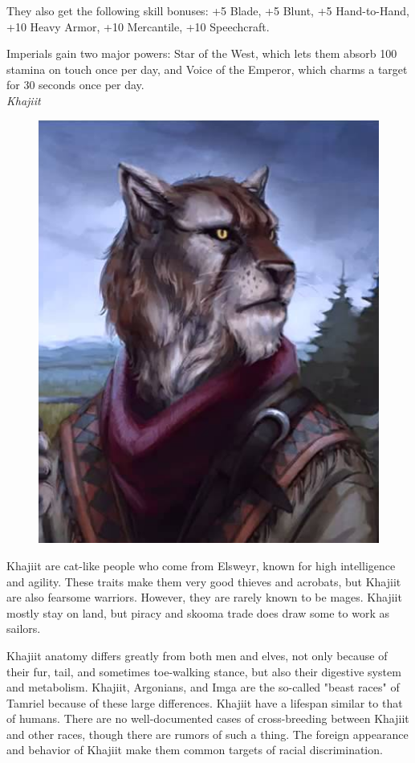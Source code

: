 \documentclass[12pt]{article}
\begin{document}
They also get the following skill bonuses: +5 Blade, +5 Blunt, +5 Hand-to-Hand, +10 Heavy Armor, +10 Mercantile, +10 Speechcraft.

Imperials gain two major powers: Star of the West, which lets them absorb 100 stamina on touch once per day, and Voice of the Emperor, which charms a target for 30 seconds once per day.\\

\noindent
\textit{Khajiit}
\begin{figure}
	\includegraphics[width=\textwidth]{Khajiit.png}
\end{figure}

Khajiit are cat-like people who come from Elsweyr, known for high intelligence and agility. These traits make them very good thieves and acrobats, but Khajiit are also fearsome warriors. However, they are rarely known to be mages. Khajiit mostly stay on land, but piracy and skooma trade does draw some to work as sailors.

Khajiit anatomy differs greatly from both men and elves, not only because of their fur, tail, and sometimes toe-walking stance, but also their digestive system and metabolism. Khajiit, Argonians, and Imga are the so-called "beast races" of Tamriel because of these large differences. Khajiit have a lifespan similar to that of humans. There are no well-documented cases of cross-breeding between Khajiit and other races, though there are rumors of such a thing. The foreign appearance and behavior of Khajiit make them common targets of racial discrimination.
\end{document}
